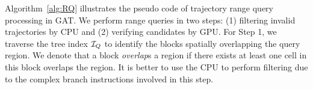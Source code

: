\documentclass[10pt,conference,letterpaper]{IEEEtran}
\newcommand{\frname}{GAT\xspace }
\newcommand{\rangecand}{{{\cal Q}_r^c}\xspace}
\newcommand{\treeindex}{{{\cal I}_Q}\xspace}
\newcommand{\eat}[1]{}
\begin{document}
\eat{
	\begin{algorithm}[t]
		\algsetup{linenosize=\tiny}
		\small
		\caption{Verification on GPU}
		\label{alg:verifyTrajRQ}
		\begin{algorithmic}[1]
			\REQUIRE ~~\\
			query region $R$; candidate blocks $\rangecand$; number of threads in a CUDA block $N_{th}$
			\ENSURE ~~\\
			result bitmap ${\cal B}_r$;
			\FOR{each CUDA block $bID \in [0,size(\rangecand)-1]$ \textbf{parallelly}}
				\STATE ${\cal P} \leftarrow$ extractPoints();
				\FOR{$i\in [0,size({\cal P})/N_{th}-1]$}
					\FOR{each CUDA thread $thID \in [0,N_{th}-1]$ \textbf{parallelly}}
						\STATE $p \leftarrow {\cal P}[i*N_{th} + thID]$;
						\IF{$p\in R$}
							\STATE ${\cal B}_r[p.tID]\leftarrow TRUE$;
						\ENDIF
					\ENDFOR
				\ENDFOR
			\ENDFOR
			\RETURN ${\cal B}_r$
		\end{algorithmic}
	\end{algorithm}
}



Algorithm~\ref{alg:RQ} illustrates the pseudo code of trajectory range query processing in \frname. We perform range queries in two steps: (1) filtering invalid trajectories by CPU and
(2) verifying candidates by GPU. For Step 1, we traverse the tree index $\treeindex$ to identify the blocks spatially overlapping the query region. We denote that a block \emph{overlap}s a region if there exists at least one cell in this block overlaps the region.
It is better to use the CPU to perform filtering due to the complex branch instructions involved in this step.

\end{document}
